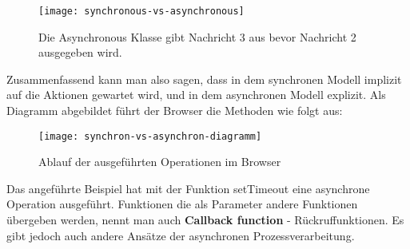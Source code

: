 \begin{figure}[H]
\centering
\texttt{[image: synchronous-vs-asynchronous]}
\caption{Die Asynchronous Klasse gibt Nachricht 3 aus bevor Nachricht 2 ausgegeben wird.}
\end{figure}

\noindent
Zusammenfassend kann man also sagen, dass in dem synchronen Modell implizit auf die Aktionen gewartet wird, und in dem asynchronen Modell explizit. Als Diagramm abgebildet führt der Browser die Methoden wie folgt aus:

\begin{center}
\begin{figure}[H]
\texttt{[image: synchron-vs-asynchron-diagramm]}
\caption{Ablauf der ausgeführten Operationen im Browser}
\end{figure}
\end{center}

\noindent
Das angeführte Beispiel hat mit der Funktion setTimeout eine asynchrone Operation ausgeführt. Funktionen die als Parameter andere Funktionen übergeben werden, nennt man auch \textbf{Callback function} - Rückruffunktionen. Es gibt jedoch auch andere Ansätze der asynchronen Prozessverarbeitung.





